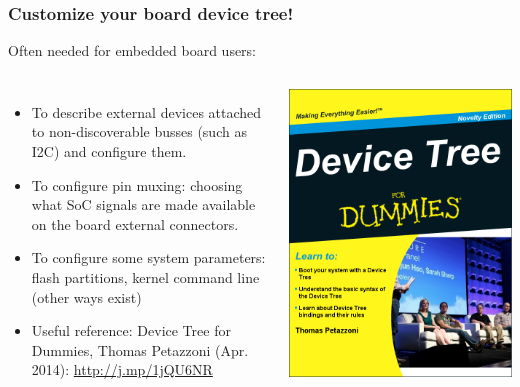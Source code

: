 \begin{frame}
  \frametitle{Customize your board device tree!}
  Often needed for embedded board users:
  \begin{columns}
       \begin{itemize}
       \item To describe external devices attached to non-discoverable
             busses (such as I2C) and configure them.
       \item To configure pin muxing: choosing what SoC signals are
	     made available on the board external connectors.
       \item To configure some system parameters: flash partitions,
	     kernel command line (other ways exist)
       \item Useful reference: Device Tree for Dummies, Thomas Petazzoni (Apr. 2014):
             \url{http://j.mp/1jQU6NR}
       \end{itemize}
    \includegraphics[height=0.6\textheight]{slides/sysdev-kernel-building/device-tree-for-dummies.png}
  \end{columns}
\end{frame}

